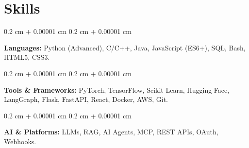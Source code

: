 \documentclass[10pt, letterpaper]{article}
\newenvironment{onecolentry}{
    \begin{adjustwidth}{
        0.2 cm + 0.00001 cm
    }{
        0.2 cm + 0.00001 cm
    }
}{
    \end{adjustwidth}
} %
\begin{document}
    \section{Skills}

    \begin{onecolentry}
    \textbf{Languages:} Python (Advanced), C/C++, Java, JavaScript (ES6+), SQL, Bash, HTML5, CSS3.
    \end{onecolentry}
    
    \begin{onecolentry}
    \textbf{Tools \& Frameworks:} PyTorch, TensorFlow, Scikit-Learn, Hugging Face, LangGraph, Flask, FastAPI, React, Docker, AWS, Git.
    \end{onecolentry}
    
    \begin{onecolentry}
    \textbf{AI \& Platforms:} LLMs, RAG, AI Agents, MCP, REST APIs, OAuth, Webhooks.
    \end{onecolentry}

    
\end{document}
